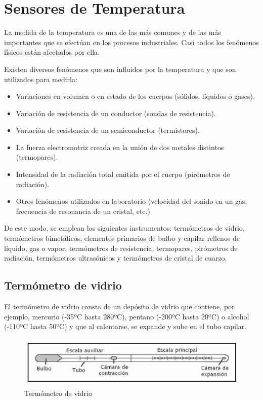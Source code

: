 \chapter{Sensores de Temperatura}

La medida de la temperatura es una de las más comunes y de las más importantes que se efectúan en los procesos industriales. Casi todos los fenómenos físicos están afectados por ella. 

Existen diversos fenómenos que son influidos por la temperatura y que son utilizados para medirla:
\begin{itemize}
    \item Variaciones en volumen o en estado de los cuerpos (sólidos, líquidos o gases).
    \item Variación de resistencia de un conductor (sondas de resistencia).
    \item Variación de resistencia de un semiconductor (termistores).
    \item La fuerza electromotriz creada en la unión de dos metales distintos (termopares).
    \item Intensidad de la radiación total emitida por el cuerpo (pirómetros de radiación).
    \item Otros fenómenos utilizados en laboratorio (velocidad del sonido en un gas, frecuencia de resonancia de un cristal, etc.)
\end{itemize}
De este modo, se emplean los siguientes instrumentos: termómetros de vidrio, termómetros bimetálicos, elementos primarios de bulbo y capilar rellenos de líquido, gas o vapor, termómetros de resistencia, termopares, pirómetros de radiación, termómetros ultrasónicos y termómetros de cristal de cuarzo.

\section{Termómetro de vidrio}
El termómetro de vidrio consta de un depósito de vidrio que contiene, por ejemplo, mercurio (-35ºC hasta 280ºC), pentano (-200ºC hasta 20ºC) o alcohol (-110ºC hasta 50ºC) y que al calentarse, se expande y sube en el tubo capilar.

\begin{figure} [H]
    \centering
    \includegraphics[width=0.5\linewidth]{Imagenes/Termometro de vidrio.png}
    \caption{Termómetro de vidrio}
\end{figure}

